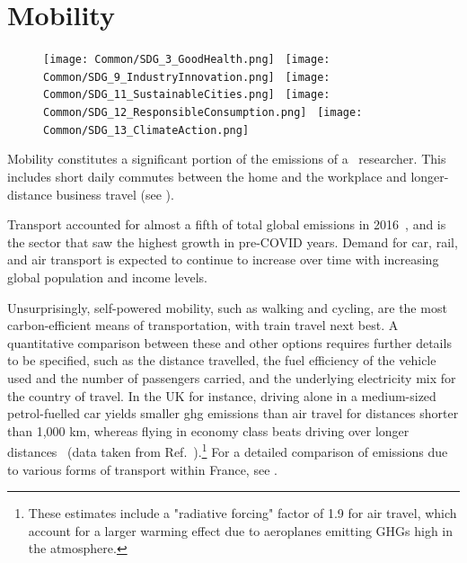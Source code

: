 \documentclass[../SustainableHEP.tex]{subfiles}
\begin{document}
\RaggedRight
\sloppy
\newpage


\section{Mobility}
\label{sec:Travel}


\begin{figure}
\texttt{[image: Common/SDG\_3\_GoodHealth.png]}~%
\texttt{[image: Common/SDG\_9\_IndustryInnovation.png]}~%
\texttt{[image: Common/SDG\_11\_SustainableCities.png]}~%
\texttt{[image: Common/SDG\_12\_ResponsibleConsumption.png]}~%
\texttt{[image: Common/SDG\_13\_ClimateAction.png]}
\end{figure}


\exSum

\noindent Mobility constitutes a significant portion of the emissions of a \ACR\ researcher.  This includes short daily commutes between the home and the workplace and longer-distance business travel (see ).

Transport accounted for almost a fifth of total global emissions in 2016~\cite{OWIDsector}, and is the sector that saw the highest growth in pre-COVID years.  Demand for car, rail, and air transport is expected to continue to increase over time with increasing global population and income levels.

Unsurprisingly, self-powered mobility, such as walking and cycling, are the most carbon-efficient means of transportation, with train travel next best.  A quantitative comparison between these and other options requires further details to be specified, such as the distance travelled, the fuel efficiency of the vehicle used and the number of passengers carried, and the underlying electricity mix for the country of travel.  In the UK for instance, driving alone in a medium-sized petrol-fuelled car yields smaller \acrshort{ghg} emissions than air travel for distances shorter than 1,000 km, whereas flying in economy class beats driving over longer distances~\cite{OWIDtravel} (data taken from Ref.~\cite{BEIS}).\footnote{These estimates include a "radiative forcing" factor of 1.9 for air travel, which account for a larger warming effect due to aeroplanes emitting GHGs high in the atmosphere.} 
For a detailed comparison of emissions due to various forms of transport within France, see .
\end{document}
